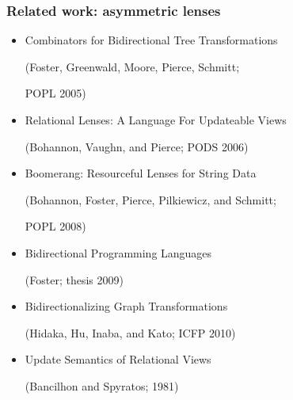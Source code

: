 \documentclass[14pt]{beamer}
\begin{document}
\begin{frame}
    \frametitle{Related work: asymmetric lenses}
    \begin{itemize}
        \small
        \item Combinators for Bidirectional Tree Transformations

            \quad (Foster, Greenwald, Moore, Pierce, Schmitt;

            \quad POPL 2005)
        \item Relational Lenses: A Language For Updateable Views

            \quad (Bohannon, Vaughn, and Pierce; PODS 2006)
        \item Boomerang: Resourceful Lenses for String Data

            \quad (Bohannon, Foster, Pierce, Pilkiewicz, and Schmitt;

            \quad POPL 2008)

        \item Bidirectional Programming Languages

            \quad (Foster; thesis 2009)
        \item Bidirectionalizing Graph Transformations

            \quad (Hidaka, Hu, Inaba, and Kato; ICFP 2010)
        \item Update Semantics of Relational Views

            \quad (Bancilhon and Spyratos; 1981)
    \end{itemize}
\end{frame}
\end{document}
